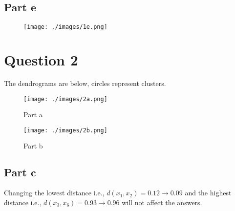 \documentclass{article}
\begin{document}
\subsection*{Part e}
\begin{figure}[H]
\centering
\texttt{[image: ./images/1e.png]}
\end{figure}

\section*{Question 2}
The dendrograms are below, circles represent clusters.
\begin{figure}[H]
\begin{minipage}{0.48\linewidth}
\centering
\texttt{[image: ./images/2a.png]}
\caption{Part a}
\end{minipage}
\hfill
\begin{minipage}{0.48\linewidth}
\centering
\texttt{[image: ./images/2b.png]}
\caption{Part b}
\end{minipage}
\end{figure}

\subsection*{Part c}
Changing the lowest distance i.e., \(d(x_1, x_2) = 0.12 \rightarrow 0.09\) and the highest distance i.e., \(d(x_3, x_6) = 0.93 \rightarrow 0.96\) will not affect the answers.
\end{document}
